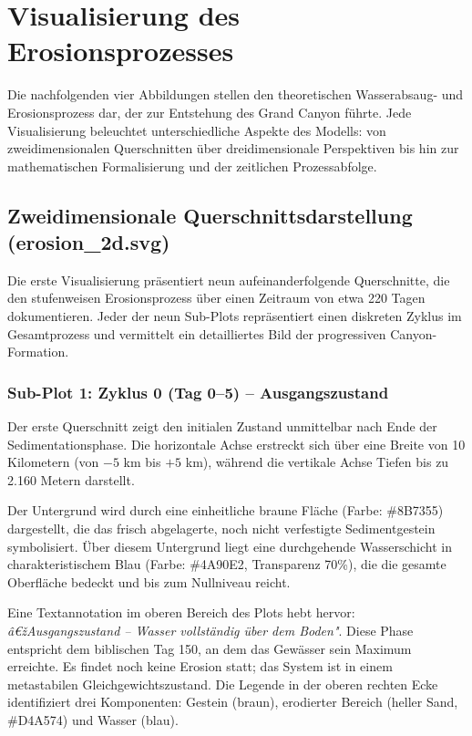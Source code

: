 ﻿\section{Visualisierung des Erosionsprozesses}

Die nachfolgenden vier Abbildungen stellen den theoretischen Wasserabsaug- und Erosionsprozess dar, der zur Entstehung des Grand Canyon führte. Jede Visualisierung beleuchtet unterschiedliche Aspekte des Modells: von zweidimensionalen Querschnitten über dreidimensionale Perspektiven bis hin zur mathematischen Formalisierung und der zeitlichen Prozessabfolge.

\subsection{Zweidimensionale Querschnittsdarstellung (erosion\_2d.svg)}

Die erste Visualisierung präsentiert neun aufeinanderfolgende Querschnitte, die den stufenweisen Erosionsprozess über einen Zeitraum von etwa 220 Tagen dokumentieren. Jeder der neun Sub-Plots repräsentiert einen diskreten Zyklus im Gesamtprozess und vermittelt ein detailliertes Bild der progressiven Canyon-Formation.

\subsubsection*{Sub-Plot 1: Zyklus 0 (Tag 0--5) -- Ausgangszustand}

Der erste Querschnitt zeigt den initialen Zustand unmittelbar nach Ende der Sedimentationsphase. Die horizontale Achse erstreckt sich über eine Breite von 10 Kilometern (von $-5$ km bis $+5$ km), während die vertikale Achse Tiefen bis zu 2.160 Metern darstellt. 

Der Untergrund wird durch eine einheitliche braune Fläche (Farbe: \#8B7355) dargestellt, die das frisch abgelagerte, noch nicht verfestigte Sedimentgestein symbolisiert. Über diesem Untergrund liegt eine durchgehende Wasserschicht in charakteristischem Blau (Farbe: \#4A90E2, Transparenz 70\%), die die gesamte Oberfläche bedeckt und bis zum Nullniveau reicht.

Eine Textannotation im oberen Bereich des Plots hebt hervor: \textit{â€žAusgangszustand -- Wasser vollständig über dem Boden"}. Diese Phase entspricht dem biblischen Tag 150, an dem das Gewässer sein Maximum erreichte. Es findet noch keine Erosion statt; das System ist in einem metastabilen Gleichgewichtszustand. Die Legende in der oberen rechten Ecke identifiziert drei Komponenten: Gestein (braun), erodierter Bereich (heller Sand, \#D4A574) und Wasser (blau).

